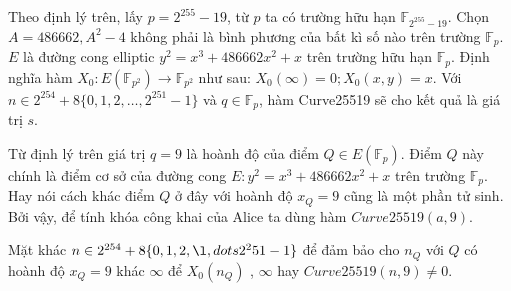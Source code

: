 \documentclass[a4paper,12pt]{report}
\begin{document}
Theo định lý trên, lấy $p = 2^255 - 19$, từ $p$ ta có trường hữu hạn $\mathbb{F}_{2^{255}-19}$. Chọn $A = 486662,A^2 - 4$ không phải là bình phương của bất kì số nào trên trường $\mathbb{F}_p$. $E$ là đường cong elliptic $y^2 = x^3 + 486662x^2 + x$ trên trường hữu hạn $\mathbb{F}_p$. Định nghĩa hàm $X_0 : E(\mathbb{F}_{p^2} ) \rightarrow \mathbb{F}_{p^2}$ như sau: $X_0(\infty) = 0; X_0(x, y) = x$. Với $n \in 2^{254} + 8\{0, 1, 2, \ldots, 2^{251} - 1\}$ và $q \in \mathbb{F}_p$, hàm Curve25519 sẽ cho kết quả là giá trị $s$.

Từ định lý trên giá trị $q = 9$ là hoành độ của điểm $Q \in E(\mathbb{F}_p)$. Điểm $Q$ này chính là điểm cơ sở của đường cong $E : y^2 = x^3 + 486662x^2 + x$ trên trường $\mathbb{F}_p$. Hay nói cách khác điểm $Q$ ở đây với hoành độ $x_Q = 9$ cũng là một phần tử sinh. Bởi vậy, để tính khóa công khai của Alice ta dùng hàm $Curve25519(a, 9)$.

Mặt khác $n \in 2^{254} + 8\{0, 1, 2, \l,dots 2^251 - 1\}$ để đảm bảo cho $n_Q$ với $Q$ có hoành độ $x_Q = 9$ khác $\infty$ để $X_0(n_Q)$ , $\infty$ hay $Curve25519(n, 9) \neq 0$.
\end{document}
